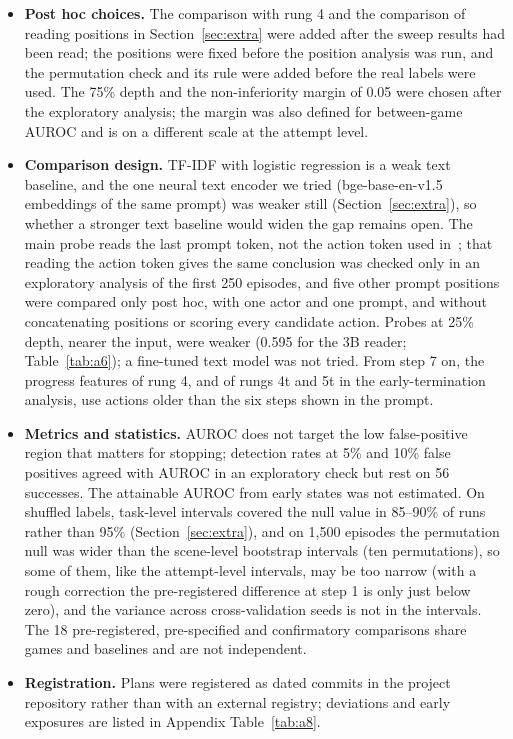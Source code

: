 \documentclass[11pt]{article}
\begin{document}
\begin{itemize}
\item \textbf{Post hoc choices.} The comparison with rung 4 and the comparison of reading positions in Section~\ref{sec:extra} were added after the sweep results had been read; the positions were fixed before the position analysis was run, and the permutation check and its rule were added before the real labels were used. The 75\% depth and the non-inferiority margin of 0.05 were chosen after the exploratory analysis; the margin was also defined for between-game AUROC and is on a different scale at the attempt level.
\item \textbf{Comparison design.} TF-IDF with logistic regression is a weak text baseline, and the one neural text encoder we tried (bge-base-en-v1.5 embeddings of the same prompt) was weaker still (Section~\ref{sec:extra}), so whether a stronger text baseline would widen the gap remains open. The main probe reads the last prompt token, not the action token used in~\cite{ruan2026doomed}; that reading the action token gives the same conclusion was checked only in an exploratory analysis of the first 250 episodes, and five other prompt positions were compared only post hoc, with one actor and one prompt, and without concatenating positions or scoring every candidate action. Probes at 25\% depth, nearer the input, were weaker (0.595 for the 3B reader; Table~\ref{tab:a6}); a fine-tuned text model was not tried. From step 7 on, the progress features of rung 4, and of rungs 4t and 5t in the early-termination analysis, use actions older than the six steps shown in the prompt.
\item \textbf{Metrics and statistics.} AUROC does not target the low false-positive region that matters for stopping; detection rates at 5\% and 10\% false positives agreed with AUROC in an exploratory check but rest on 56 successes. The attainable AUROC from early states was not estimated. On shuffled labels, task-level intervals covered the null value in 85--90\% of runs rather than 95\% (Section~\ref{sec:extra}), and on 1,500 episodes the permutation null was wider than the scene-level bootstrap intervals (ten permutations), so some of them, like the attempt-level intervals, may be too narrow (with a rough correction the pre-registered difference at step 1 is only just below zero), and the variance across cross-validation seeds is not in the intervals. The 18 pre-registered, pre-specified and confirmatory comparisons share games and baselines and are not independent.
\item \textbf{Registration.} Plans were registered as dated commits in the project repository rather than with an external registry; deviations and early exposures are listed in Appendix Table~\ref{tab:a8}.

\end{itemize}
\end{document}
